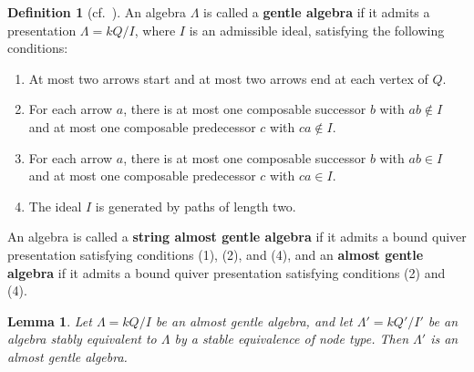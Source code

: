 \documentclass[11pt]{article}
\providecommand{\varLambda}{\Lambda}
\newtheorem{lemma}[theorem]{Lemma}
\theoremstyle{definition}
\newtheorem{definition}[theorem]{Definition}
\begin{document}
		\begin{definition}[{cf.~\cite{GR05,GS19,FGR22}}]
			An algebra $\varLambda$ is called a \textbf{gentle algebra} if it admits a presentation $\varLambda=kQ/I$, where $I$ is an admissible ideal, satisfying the following conditions:
			\begin{enumerate}
				\item At most two arrows start and at most two arrows end at each vertex of $Q$.

				\item For each arrow $a$, there is at most one composable successor $b$ with $ab\notin I$ and at most one composable	predecessor $c$ with $ca\notin I$.

				\item For each arrow $a$, there is at most one composable successor $b$ with $ab\in I$ and at most one composable predecessor $c$ with $ca\in I$.

				\item The ideal $I$ is generated by paths of length two.
			\end{enumerate}
			An algebra is called a \textbf{string almost gentle algebra} if it admits a bound quiver presentation satisfying conditions (1), (2), and (4), and an \textbf{almost gentle algebra} if it admits a bound quiver presentation satisfying conditions (2) and (4).
		\end{definition}



		\begin{lemma}\label{lemma of AG node type}
			Let $\varLambda=kQ/I$ be an almost gentle algebra, and let $\varLambda'=kQ'/I'$ be an algebra stably equivalent to $\varLambda$ by a stable equivalence of node type.
			Then $\varLambda'$ is an almost gentle algebra.
		\end{lemma}
\end{document}

